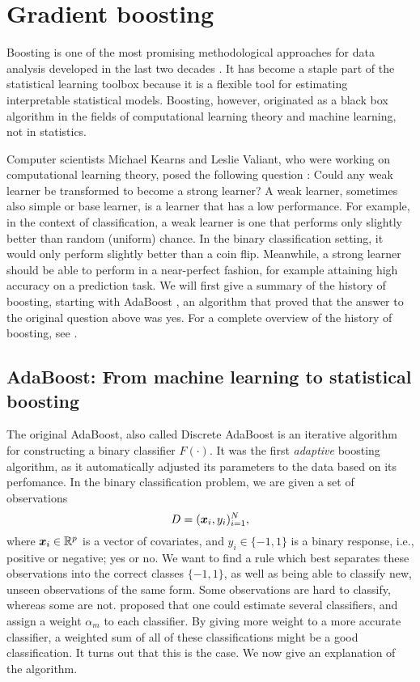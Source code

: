 \chapter{Gradient boosting}\label{ch:boosting}
Boosting is one of the most promising methodological approaches for data analysis developed in the last two decades \citep{mayr14a}.
It has become a staple part of the statistical learning toolbox because it is a flexible tool for estimating interpretable statistical models.
Boosting, however, originated as a black box algorithm in the fields of computational learning theory and machine learning, not in statistics.

Computer scientists Michael Kearns and Leslie Valiant, who were working on computational learning theory, posed the following question \citep{kearnsvaliant}: 
Could any weak learner be transformed to become a strong learner?
A weak learner, sometimes also simple or base learner, is a learner that has a low performance.
For example, in the context of classification, a weak learner is one that performs only slightly better than random (uniform) chance.
In the binary classification setting, it would only perform slightly better than a coin flip.
Meanwhile, a strong learner should be able to perform in a near-perfect fashion, for example attaining high accuracy on a prediction task.
We will first give a summary of the history of boosting, starting with AdaBoost \citep{adaboost}, an algorithm that proved that the answer to the original question above was yes.
For a complete overview of the history of boosting, see \citet{mayr14a, mayr14b, mayr17}.

\section{AdaBoost: From machine learning to statistical boosting}
The original AdaBoost, also called Discrete AdaBoost \citep{adaboost} is an iterative algorithm for constructing a binary classifier $F(\cdot)$.
It was the first \textit{adaptive} boosting algorithm, as it automatically adjusted its parameters to the data based on its perfomance.
In the binary classification problem, we are given a set of observations
\begin{equation*}
    D=(\bm{x}_i,y_i)_{i=1}^N,
\end{equation*}
where $\bm{x}_i\in\mathbb{R}^p$ is a vector of covariates, and $y_i\in\{-1,1\}$ is a binary response, i.e., positive or negative; yes or no.
We want to find a rule which best separates these observations into the correct classes $\{-1,1\}$, as well as being able to classify new, unseen observations of the same form.
Some observations are hard to classify, whereas some are not.
\citet{adaboost} proposed that one could estimate several classifiers, and assign a weight $\alpha_m$ to each classifier.
By giving more weight to a more accurate classifier, a weighted sum of all of these classifications might be a good classification.
It turns out that this is the case.
We now give an explanation of the algorithm.

